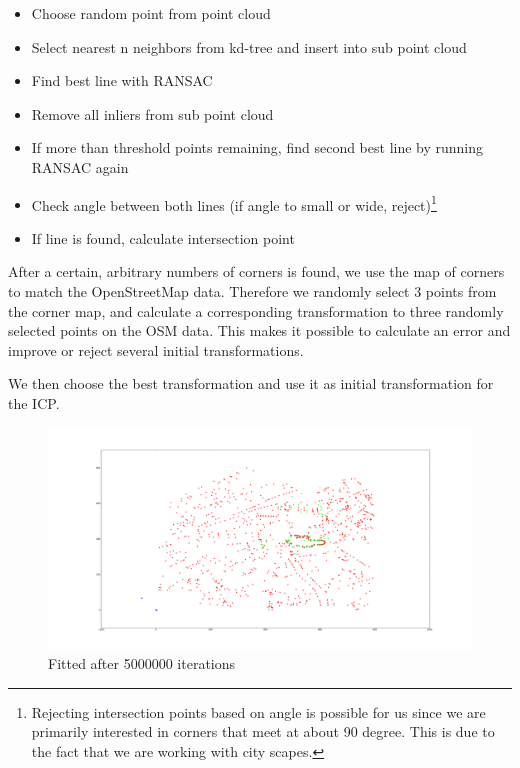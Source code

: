 \documentclass[10pt,twocolumn,letterpaper]{article}
\begin{document}
\begin{itemize}
    \item Choose random point from point cloud
    \item Select nearest n neighbors from kd-tree and insert into sub point cloud
    \item Find best line with RANSAC
    \item Remove all inliers from sub point cloud
    \item If more than threshold points remaining, find second best line by running RANSAC again
    \item Check angle between both lines (if angle to small or wide, reject)\footnote{Rejecting intersection points based on angle is possible for us since we are primarily interested in corners that meet at about 90 degree. This is due to the fact that we are working with city scapes.} 
    \item If line is found, calculate intersection point
\end{itemize} 

After a certain, arbitrary numbers of corners is found, we use the map of corners to match the OpenStreetMap data. Therefore we randomly select 3 points from the corner map, and calculate a corresponding transformation to three randomly selected points on the OSM data. This makes it possible to calculate an error and improve or reject several initial transformations.

We then choose the best transformation and use it as initial transformation for the ICP.

\begin{figure}
  \centering
  \includegraphics[width=.8\linewidth]{images/goodmatch.png}
  \caption{Fitted after 5000000 iterations}
  \label{fig:goodmatch}
\end{figure}
\end{document}
